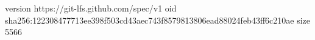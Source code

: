 version https://git-lfs.github.com/spec/v1
oid sha256:122308477713ee398f503cd43aec743f8579813806ead88024feb43ff6c210ae
size 5566
